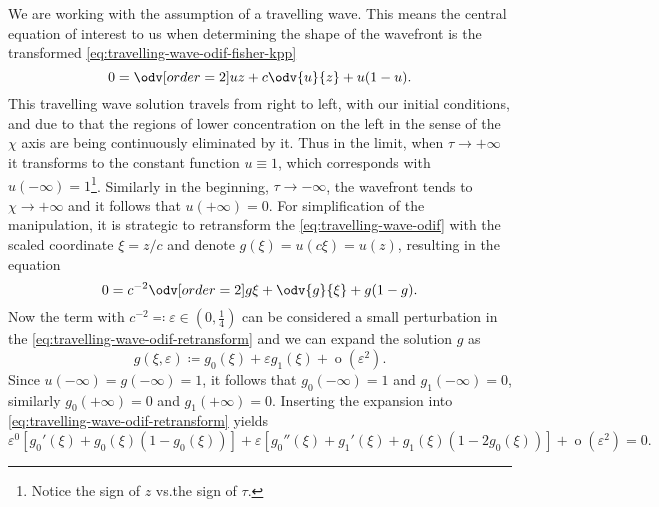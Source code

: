 We are working with the assumption of a travelling wave.
This means the central equation of interest to us when determining the shape of the wavefront is the transformed
    \cref{eq:travelling-wave-odif-fisher-kpp}
    \begin{equation}
        \label{eq:travelling-wave-odif}
        0 = \odv[order={2}]{u}{z} + c \odv{u}{z} + u(1-u).
    \end{equation}
This travelling wave solution travels from right to left, with our initial conditions, and due to that the regions of 
    lower concentration on the left in the sense of the \(\chi\) axis are being continuously eliminated by it.
Thus in the limit, when \(\tau \to +\infty\) it transforms to the constant function \(u \equiv 1\), which corresponds 
    with \(u(-\infty) = 1\)\footnote{Notice the sign of \(z\) vs.\@ the sign of \(\tau\).}.
Similarly in the beginning, \(\tau \to -\infty\), the wavefront tends to \(\chi \to +\infty \) and it follows that
    \( u(+\infty) = 0\).
For simplification of the manipulation, it is strategic to retransform the \cref{eq:travelling-wave-odif}
    with the scaled coordinate \(\xi = z/c\) and denote \(g(\xi) = u(c\xi) = u(z)\), resulting in the equation
    \begin{equation}
        \label{eq:travelling-wave-odif-retransform}
        0 = c^{-2}\odv[order={2}]{g}{\xi} + \odv{g}{\xi} + g(1-g).
    \end{equation}
Now the term with \(c^{-2} \eqqcolon \varepsilon \in (0, \tfrac{1}{4})\) can be considered a small perturbation in the 
    \cref{eq:travelling-wave-odif-retransform} and we can expand the solution \(g\) as \[
    g(\xi, \varepsilon) \coloneqq g_0(\xi) + \varepsilon g_1(\xi) + \mathop{o}(\varepsilon^2).
\] 
Since \(u(-\infty) = g(-\infty) = 1\), it follows that \(g_0(-\infty) = 1\) and \(g_1(-\infty) = 0\), similarly
    \(g_0(+\infty) = 0\) and \(g_1(+\infty) = 0\).
Inserting the expansion into \cref{eq:travelling-wave-odif-retransform} yields \begin{equation}
    \label{eq:travelling-wave-odif-retransform-expanded}
    \varepsilon^{0}[g_0'(\xi) + g_0(\xi)(1 - g_0(\xi))] + \varepsilon [g_0''(\xi) + g_1'(\xi) + g_1(\xi)(1 - 2g_0(\xi))] 
    + \mathop{o}(\varepsilon^2) = 0.
\end{equation}

